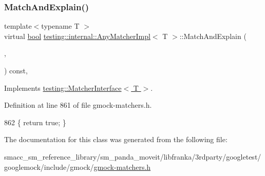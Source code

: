 \subsubsection{\texorpdfstring{Match\+And\+Explain()}{MatchAndExplain()}}
{\footnotesize\ttfamily template$<$typename T $>$ \\
virtual \hyperlink{classbool}{bool} \hyperlink{classtesting_1_1internal_1_1AnyMatcherImpl}{testing\+::internal\+::\+Any\+Matcher\+Impl}$<$ T $>$\+::Match\+And\+Explain (\begin{DoxyParamCaption}\item[{T}]{,  }\item[{\hyperlink{classtesting_1_1MatchResultListener}{Match\+Result\+Listener} $\ast$}]{ }\end{DoxyParamCaption}) const\hspace{0.3cm}{\ttfamily [inline]}, {\ttfamily [virtual]}}



Implements \hyperlink{classtesting_1_1MatcherInterface_a296b43607cd99d60365f0e6a762777cf}{testing\+::\+Matcher\+Interface$<$ T $>$}.



Definition at line 861 of file gmock-\/matchers.\+h.


\begin{DoxyCode}
862                                          \{ \textcolor{keywordflow}{return} \textcolor{keyword}{true}; \}
\end{DoxyCode}


The documentation for this class was generated from the following file\+:\begin{DoxyCompactItemize}
\item 
smacc\+\_\+sm\+\_\+reference\+\_\+library/sm\+\_\+panda\+\_\+moveit/libfranka/3rdparty/googletest/googlemock/include/gmock/\hyperlink{gmock-matchers_8h}{gmock-\/matchers.\+h}\end{DoxyCompactItemize}

